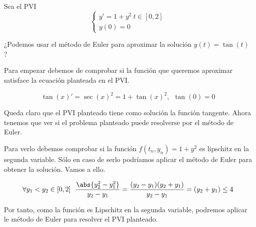 \begin{problem}[3]
Sea el PVI
\[\left\{ \begin{array}{l}y'=1+y^2 \ t \in [0,2] \\
y(0)=0\end{array}
\right.\]

¿Podemos usar el método de Euler para aproximar la solución $y(t)=\tan(t)$?

\solution


Para empezar debemos de comprobar si la función que queremos aproximar satisface la ecuación planteada en el PVI.

\[\tan(x)' = \sec(x)^2 = 1 + \tan(x)^2, \ \ \tan(0)=0\]

Queda claro que el PVI planteado tiene como solución la función tangente. Ahora tenemos que ver si el problema planteado puede resolverse por el método de Euler.

Para verlo debemos comprobar si la función $f(t_n,y_n)=1+y^2$ es lipschitz en la segunda variable. Sólo en caso de serlo podríamos aplicar el método de Euler para obtener la solución. Vamos a ello.

\[\forall y_1<y_2 \in [0,2] \ \ \frac{\abs{y_2^2 - y_1^2}}{y_2-y_1}=\frac{(y_2-y_1)(y_2+y_1)}{y_2-y_1} = (y_2+y_1) \leq 4\]

Por tanto, como la función es Lipschitz en la segunda variable, podremos aplicar le método de Euler para resolver el PVI planteado.
\end{problem}


